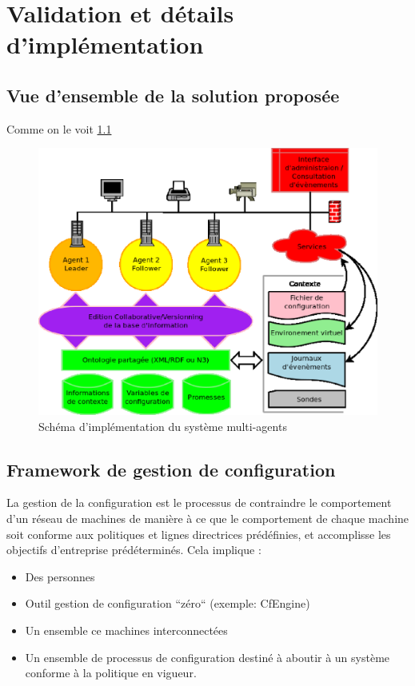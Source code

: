 \chapter{Validation et détails d'implémentation}

\section{Vue d'ensemble de la solution proposée}

Comme on le voit \ref{archi}

\begin{figure}
    \centering
    \includegraphics[width=.67\textwidth]{img/archi}
    \caption{Schéma d'implémentation du système multi-agents}
    \label{archi}
\end{figure}


\section{Framework de gestion de configuration}

La gestion de la configuration est le processus de contraindre le comportement
d'un réseau de machines de manière à ce que le comportement de chaque machine
soit conforme aux politiques et lignes directrices prédéfinies, et
accomplisse les objectifs d'entreprise prédéterminés. Cela implique :

\begin{itemize}
  \item Des personnes
  \item Outil gestion de configuration ``zéro`` (exemple: CfEngine)
  \item Un ensemble ce machines interconnectées
  \item Un ensemble de processus de configuration destiné à aboutir à un système
	  conforme à la politique en vigueur.
\end{itemize}


